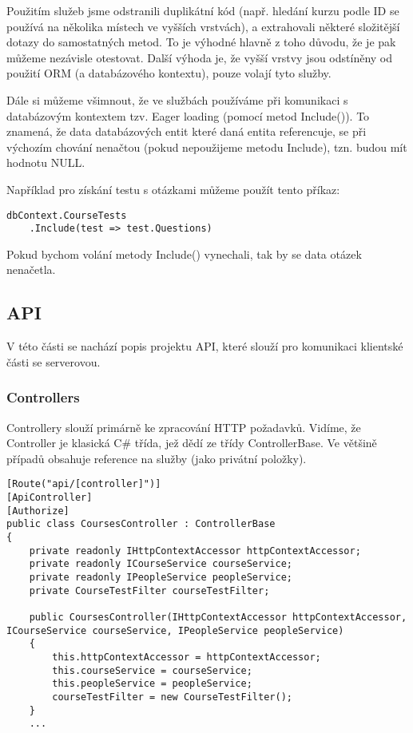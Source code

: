 Použitím služeb jsme odstranili duplikátní kód (např. hledání kurzu podle ID se používá na několika místech ve vyšších vrstvách), a extrahovali některé složitější dotazy do samostatných metod. To je výhodné hlavně z toho důvodu, že je pak můžeme nezávisle otestovat. Další výhoda je, že vyšší vrstvy jsou odstíněny od použití ORM (a databázového kontextu), pouze volají tyto služby.

Dále si můžeme všimnout, že ve službách používáme při komunikaci s databázovým kontextem tzv. Eager loading (pomocí metod Include()). To znamená, že data databázových entit které daná entita referencuje, se při výchozím chování nenačtou (pokud nepoužijeme metodu Include), tzn. budou mít hodnotu NULL.

Například pro získání testu s otázkami můžeme použít tento příkaz:
\begin{lstlisting}
dbContext.CourseTests
	.Include(test => test.Questions)
\end{lstlisting}
Pokud bychom volání metody Include() vynechali, tak by se data otázek nenačetla.

\newpage

\subsection{API}
V této části se nachází popis projektu API, které slouží pro komunikaci klientské části se serverovou.

\subsubsection*{Controllers}
Controllery slouží primárně ke zpracování HTTP požadavků. Vidíme, že Controller je klasická C\# třída, jež dědí ze třídy ControllerBase. Ve většině případů obsahuje reference na služby (jako privátní položky).

\begin{lstlisting}
[Route("api/[controller]")]
[ApiController]
[Authorize]
public class CoursesController : ControllerBase
{
	private readonly IHttpContextAccessor httpContextAccessor;
	private readonly ICourseService courseService;
	private readonly IPeopleService peopleService;
	private CourseTestFilter courseTestFilter;
	
	public CoursesController(IHttpContextAccessor httpContextAccessor, ICourseService courseService, IPeopleService peopleService)
	{
		this.httpContextAccessor = httpContextAccessor;
		this.courseService = courseService;
		this.peopleService = peopleService;
		courseTestFilter = new CourseTestFilter();
	}
	...
\end{lstlisting}

